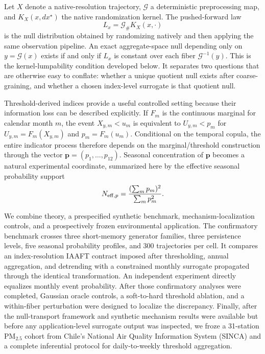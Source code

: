 Let $X$ denote a native-resolution trajectory, $\mathcal G$ a deterministic preprocessing map, and $K_X(x,dx^\star)$ the native randomization kernel. The pushed-forward law
\[
L_x=\mathcal G_\#K_X(x,\cdot)
\]
is the null distribution obtained by randomizing natively and then applying the same observation pipeline. An exact aggregate-space null depending only on $y=\mathcal G(x)$ exists if and only if $L_x$ is constant over each fiber $\mathcal G^{-1}(y)$. This is the kernel-lumpability condition developed below. It separates two questions that are otherwise easy to conflate: whether a unique quotient null exists after coarse-graining, and whether a chosen index-level surrogate is that quotient null.

Threshold-derived indices provide a useful controlled setting because their information loss can be described explicitly. If $F_m$ is the continuous marginal for calendar month $m$, the event $X_{y,m}<u_m$ is equivalent to $U_{y,m}<p_m$ for $U_{y,m}=F_m(X_{y,m})$ and $p_m=F_m(u_m)$. Conditional on the temporal copula, the entire indicator process therefore depends on the marginal/threshold construction through the vector $\mathbf p=(p_1,\ldots,p_{12})$. Seasonal concentration of $\mathbf p$ becomes a natural experimental coordinate, summarized here by the effective seasonal probability support
\[
N_{\mathrm{eff},p}=\frac{(\sum_m p_m)^2}{\sum_m p_m^2}.
\]

We combine theory, a prespecified synthetic benchmark, mechanism-localization controls, and a prospectively frozen environmental application. The confirmatory benchmark crosses three short-memory generator families, three persistence levels, five seasonal probability profiles, and 300 trajectories per cell. It compares an index-resolution IAAFT contract imposed after thresholding, annual aggregation, and detrending with a constrained monthly surrogate propagated through the identical transformation. An independent experiment directly equalizes monthly event probability. After those confirmatory analyses were completed, Gaussian oracle controls, a soft-to-hard threshold ablation, and a within-fiber perturbation were designed to localize the discrepancy. Finally, after the null-transport framework and synthetic mechanism results were available but before any application-level surrogate output was inspected, we froze a 31-station PM$_{2.5}$ cohort from Chile's National Air Quality Information System (SINCA) and a complete inferential protocol for daily-to-weekly threshold aggregation.

